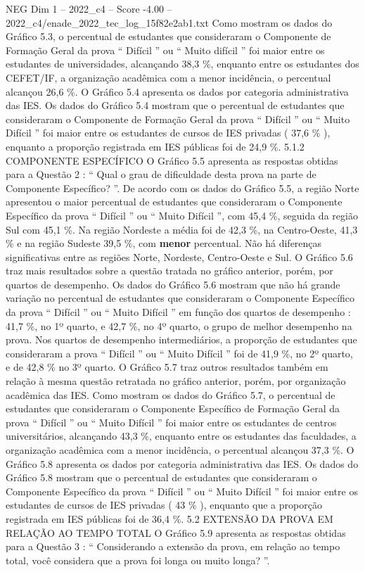 \begin{textsample}{NEG Dim 1 – 2022\_c4 – Score -4.00 – 2022\_c4/enade\_2022\_tec\_log\_15f82e2ab1.txt}
Como mostram os dados do Gráfico 5.3, o percentual de estudantes que consideraram o Componente de Formação Geral da prova “ Difícil ” ou “ Muito difícil ” foi maior entre os estudantes de universidades, alcançando 38,3 \%, enquanto entre os estudantes dos CEFET/IF, a organização acadêmica com a menor incidência, o percentual alcançou 26,6 \%.
O Gráfico 5.4 apresenta os dados por categoria administrativa das IES.
Os dados do Gráfico 5.4 mostram que o percentual de estudantes que consideraram o Componente de Formação Geral da prova “ Difícil ” ou “ Muito Difícil ” foi maior entre os estudantes de cursos de IES privadas ( 37,6 \% ), enquanto a proporção registrada em IES públicas foi de 24,9 \%. 5.1.2 COMPONENTE ESPECÍFICO O Gráfico 5.5 apresenta as respostas obtidas para a Questão 2 : “ Qual o grau de dificuldade desta prova na parte de Componente Específico? ”.
De acordo com os dados do Gráfico 5.5, a região Norte apresentou o maior percentual de estudantes que consideraram o Componente Específico da prova “ Difícil ” ou “ Muito Difícil ”, com 45,4 \%, seguida da região Sul com 45,1 \%.
Na região Nordeste a média foi de 42,3 \%, na Centro-Oeste, 41,3 \% e na região Sudeste 39,5 \%, com \textbf{menor} percentual.
Não há diferenças significativas entre as regiões Norte, Nordeste, Centro-Oeste e Sul.
O Gráfico 5.6 traz mais resultados sobre a questão tratada no gráfico anterior, porém, por quartos de desempenho.
Os dados do Gráfico 5.6 mostram que não há grande variação no percentual de estudantes que consideraram o Componente Específico da prova “ Difícil ” ou “ Muito Difícil ” em função dos quartos de desempenho : 41,7 \%, no 1º quarto, e 42,7 \%, no 4º quarto, o grupo de melhor desempenho na prova.
Nos quartos de desempenho intermediários, a proporção de estudantes que consideraram a prova “ Difícil ” ou “ Muito Difícil ” foi de 41,9 \%, no 2º quarto, e de 42,8 \% no 3º quarto.
O Gráfico 5.7 traz outros resultados também em relação à mesma questão retratada no gráfico anterior, porém, por organização acadêmica das IES.
Como mostram os dados do Gráfico 5.7, o percentual de estudantes que consideraram o Componente Específico de Formação Geral da prova “ Difícil ” ou “ Muito Difícil ” foi maior entre os estudantes de centros universitários, alcançando 43,3 \%, enquanto entre os estudantes das faculdades, a organização acadêmica com a menor incidência, o percentual alcançou 37,3 \%.
O Gráfico 5.8 apresenta os dados por categoria administrativa das IES.
Os dados do Gráfico 5.8 mostram que o percentual de estudantes que consideraram o Componente Específico da prova “ Difícil ” ou “ Muito Difícil ” foi maior entre os estudantes de cursos de IES privadas ( 43 \% ), enquanto que a proporção registrada em IES públicas foi de 36,4 \%. 5.2 EXTENSÃO DA PROVA EM RELAÇÃO AO TEMPO TOTAL O Gráfico 5.9 apresenta as respostas obtidas para a Questão 3 : “ Considerando a extensão da prova, em relação ao tempo total, você considera que a prova foi longa ou muito longa? ”.

\end{textsample}
